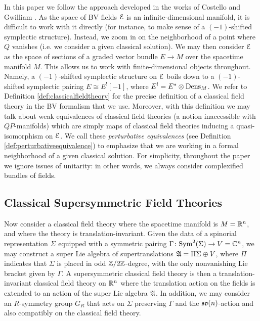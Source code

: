 \documentclass[10pt, oneside]{article}
\begin{document}
In this paper we follow the approach developed in the works of Costello and Gwilliam \cite{CostelloBook,Book1}. As the space of BV fields $\mathcal E$ is an infinite-dimensional manifold, it is difficult to work with it directly (for instance, to make sense of a $(-1)$-shifted symplectic structure). Instead, we zoom in on the neighborhood of a point where $Q$ vanishes (i.e. we consider a given classical solution). We may then consider $\mathcal E$ as the space of sections of a graded vector bundle $E\rightarrow M$ over the spacetime manifold $M$. This allows us to work with finite-dimensional objects throughout. Namely, a $(-1)$-shifted symplectic structure on $\mathcal E$ boils down to a $(-1)$-shifted symplectic pairing $E\cong E^![-1]$, where $E^!=E^*\otimes \mathrm{Dens}_M$. We refer to Definition \ref{def:classicalfieldtheory} for the precise definition of a classical field theory in the BV formalism that we use. Moreover, with this definition we may talk about weak equivalences of classical field theories (a notion inaccessible with $QP$-manifolds) which are simply maps of classical field theories inducing a quasi-isomorphism on $\mathcal E$. We call these \emph{perturbative equivalences} (see Definition \ref{def:perturbativeequivalence}) to emphasize that we are working in a formal neighborhood of a given classical solution. For simplicity, throughout the paper we ignore issues of unitarity: in other words, we always consider complexified bundles of fields.

\subsection*{Classical Supersymmetric Field Theories}

Now consider a classical field theory where the spacetime manifold is $M=\mathbb R^n$, and where the theory is translation-invariant. Given the data of a spinorial representation $\Sigma$ equipped with a symmetric pairing $\Gamma\colon{\rm Sym}^2(\Sigma)\rightarrow V=\mathbb C^n$, we may construct a super Lie algebra of supertranslations $\mathfrak A=\Pi\Sigma\oplus V$, where $\Pi$ indicates that $\Sigma$ is placed in odd $\mathbb Z/2\mathbb Z$-degree, with the only nonvanishing Lie bracket given by $\Gamma$. A supersymmetric classical field theory is then a translation-invariant classical field theory on $\mathbb R^n$ where the translation action on the fields is extended to an action of the super Lie algebra $\mathfrak A$. In addition, we may consider an $R$-symmetry group $G_R$ that acts on $\Sigma$ preserving $\Gamma$ and the $\mathfrak{so}(n)$-action and also compatibly on the classical field theory.
\end{document}
